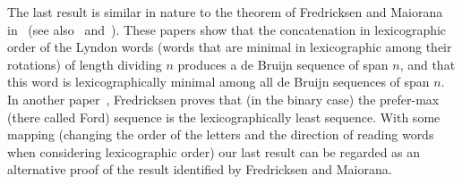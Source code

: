 \documentclass{article}
\theoremstyle{definition}
\begin{document}
The last result is similar in nature to the theorem of Fredricksen and Maiorana in~\cite{Fredricksen1978} (see also~\cite{Moreno2004} and~\cite{Moreno2015}).	
These papers show that the concatenation in lexicographic order of the Lyndon words (words that are minimal in lexicographic among their rotations) of length dividing $n$ produces a de Bruijn sequence of span $n$, and that this word is lexicographically minimal among all de Bruijn sequences of span $n$. In another paper~\cite{Fredricksen1970}, Fredricksen proves that (in the binary case) the prefer-max (there called Ford) sequence is the lexicographically least sequence. With some mapping (changing the order of the letters and the direction of reading words when considering lexicographic order) our last result can be regarded as an alternative proof of the result identified by Fredricksen and Maiorana.


{}

\end{document}
